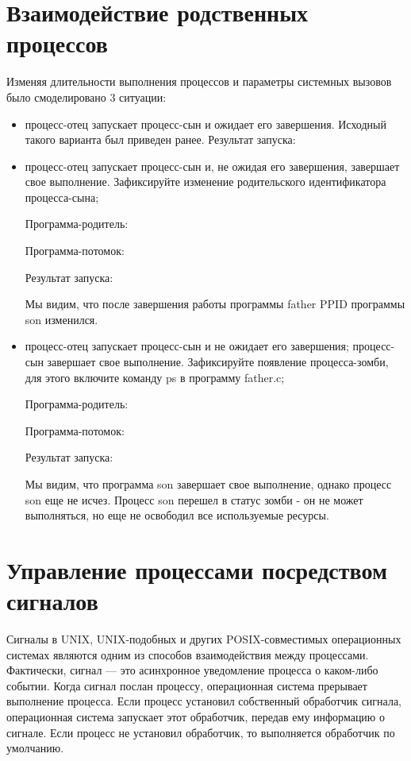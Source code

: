 \documentclass[a4paper]{article}
\begin{document}
\section{Взаимодействие родственных процессов}
	Изменяя длительности выполнения процессов и параметры системных вызовов было смоделировано 3 ситуации:
	\begin{itemize}
		\item процесс-отец запускает процесс-сын и ожидает его завершения. Исходный такого варианта был приведен ранее. Результат запуска:
	
	
		\item процесс-отец запускает процесс-сын и, не ожидая его завершения, завершает свое выполнение. Зафиксируйте изменение родительского идентификатора процесса-сына;
		
		Программа-родитель:
		

		
		Программа-потомок:
		


		Результат запуска:
		
	
		
		Мы видим, что после завершения работы программы father PPID программы son изменился.

		\item процесс-отец запускает процесс-сын и не ожидает его завершения; процесс-сын завершает свое выполнение. Зафиксируйте появление процесса-зомби, для этого включите команду ps в программу father.c;
		
		Программа-родитель:
		
		
		Программа-потомок:
		
	
		Результат запуска:
			
		
		Мы видим, что программа son завершает свое выполнение, однако процесс son еще не исчез. Процесс son перешел в статус зомби - он не может выполняться, но еще не освободил все используемые ресурсы.
	\end{itemize}
	
\section{Управление процессами посредством сигналов}
	Сигналы в UNIX, UNIX-подобных и других POSIX-совместимых операционных системах являются одним из способов взаимодействия между процессами. Фактически, сигнал --- это асинхронное уведомление процесса о каком-либо событии. Когда сигнал послан процессу, операционная система прерывает выполнение процесса. Если процесс установил собственный обработчик сигнала, операционная система запускает этот обработчик, передав ему информацию о сигнале. Если процесс не установил обработчик, то выполняется обработчик по умолчанию.
	
\end{document}
